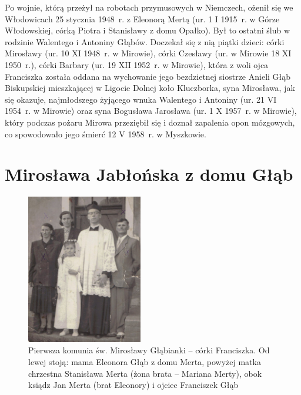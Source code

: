Po wojnie, którą przeżył na robotach przymusowych w Niemczech, ożenił się we Włodowicach 25 stycznia 1948~r. z Eleonorą Mertą (ur. 1 I 1915~r. w Górze Włodowskiej, córką Piotra i Stanisławy z domu Opałko). Był to ostatni ślub w rodzinie Walentego i Antoniny Głąbów. Doczekał się z nią piątki dzieci: córki Mirosławy (ur. 10 XI 1948~r. w Mirowie), córki Czesławy (ur. w Mirowie 18 XI 1950~r.), córki Barbary (ur. 19 XII 1952~r. w Mirowie), która z woli ojca Franciszka została oddana na wychowanie jego bezdzietnej siostrze Anieli Głąb Biskupskiej mieszkającej w Ligocie Dolnej koło Kluczborka, syna Mirosława, jak się okazuje, najmłodszego żyjącego wnuka Walentego i Antoniny (ur. 21 VI 1954~r. w Mirowie) oraz syna Bogusława Jarosława (ur. 1 X 1957~r. w Mirowie), który podczas pożaru Mirowa przeziębił się i doznał zapalenia opon mózgowych, co spowodowało jego śmierć 12 V 1958~r. w Myszkowie.





\section{Mirosława Jabłońska z domu Głąb}
   
\begin{figure}
\begin{center}
\includegraphics[width=0.45\textwidth]{zdjecia/pierwsza_komunia_miroslawy_glab.jpg}
\caption[Pierwsza Komunia św. Mirosławy Głąbianki]{Pierwsza komunia św. Mirosławy Głąbianki -- córki Franciszka. Od lewej stoją: mama Eleonora Głąb z domu Merta, powyżej matka chrzestna Stanisława Merta (żona brata -- Mariana Merty), obok ksiądz Jan Merta (brat Eleonory) i ojciec Franciszek Głąb}
\label{rys:pierwsza_komunia_miroslawy_glab}
\end{center}
\end{figure}

